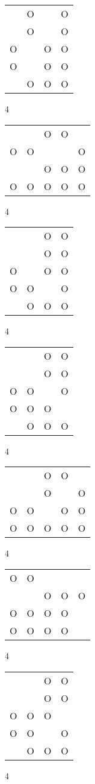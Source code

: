 \begin{tabular}{|m{0.2cm}m{0.2cm}m{0.2cm}m{0.2cm}|}\hline
 &O& &O\\
 &O& &O\\
O& &O&O\\
O& &O&O\\
 &O&O&O\\
\hline\end{tabular}4
\begin{tabular}{|m{0.2cm}m{0.2cm}m{0.2cm}m{0.2cm}m{0.2cm}|}\hline
 & &O&O& \\
O&O& & &O\\
 & &O&O&O\\
O&O&O&O&O\\
\hline\end{tabular}4
\begin{tabular}{|m{0.2cm}m{0.2cm}m{0.2cm}m{0.2cm}|}\hline
 & &O&O\\
 & &O&O\\
O& &O&O\\
O&O& &O\\
 &O&O&O\\
\hline\end{tabular}4
\begin{tabular}{|m{0.2cm}m{0.2cm}m{0.2cm}m{0.2cm}|}\hline
 & &O&O\\
 & &O&O\\
O&O& &O\\
O&O&O& \\
 &O&O&O\\
\hline\end{tabular}4
\begin{tabular}{|m{0.2cm}m{0.2cm}m{0.2cm}m{0.2cm}m{0.2cm}|}\hline
 & &O&O& \\
 & &O& &O\\
O&O& &O&O\\
O&O&O&O&O\\
\hline\end{tabular}4
\begin{tabular}{|m{0.2cm}m{0.2cm}m{0.2cm}m{0.2cm}m{0.2cm}|}\hline
O&O& & & \\
 & &O&O&O\\
O&O&O&O& \\
O&O&O&O& \\
\hline\end{tabular}4
\begin{tabular}{|m{0.2cm}m{0.2cm}m{0.2cm}m{0.2cm}|}\hline
 & &O&O\\
 & &O&O\\
O&O&O& \\
O&O& &O\\
 &O&O&O\\
\hline\end{tabular}4
